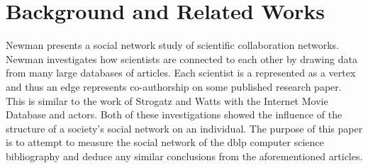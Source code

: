 \documentclass[10pt,journal,compsoc]{IEEEtran}
\begin{document}
%



\section{Background and Related Works}
	Newman  presents a social network study of scientific collaboration networks\cite{newman}. Newman investigates how scientists are connected to each other by drawing data from many large databases of articles. Each scientist is a represented as a vertex and thus an edge represents co-authorship on some published research paper. This is similar to the work of Strogatz and Watts with the Internet Movie Database and actors\cite{smol}. Both of these investigations showed the influence of the structure of a society’s social network on an individual. The purpose of this paper is to attempt to measure the social network of the dblp computer science bibliography and deduce any similar conclusions from the aforementioned articles.
	
\end{document}

